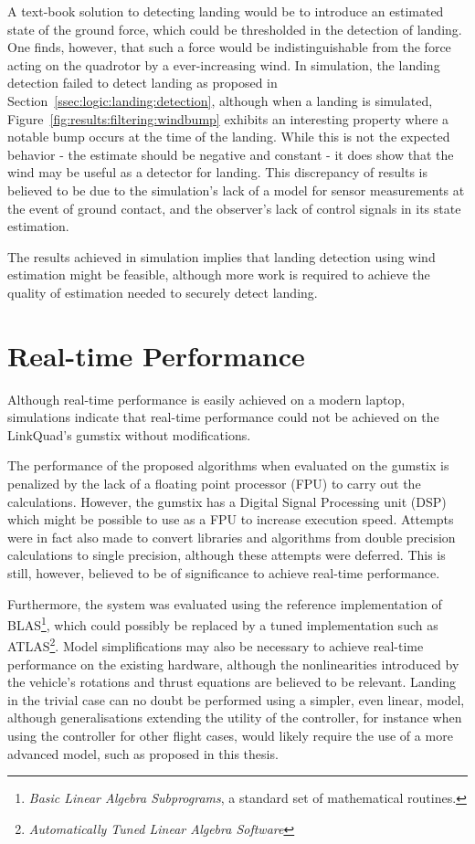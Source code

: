         A text-book solution to detecting landing would be to introduce
        an estimated state of the ground force, which could be thresholded
        in the detection of landing. One finds, however,
        that such a force would be indistinguishable from
        the force acting on the quadrotor by a ever-increasing wind.
        In simulation, the landing detection failed to detect landing
        as proposed in Section~\ref{ssec:logic:landing:detection}, although
        when a landing is simulated, Figure~\ref{fig:results:filtering:windbump}
        exhibits an interesting property where a notable bump occurs at the
        time of the landing. While this is not the expected behavior
        - the estimate should be negative and constant -
        it does show that the wind may be useful as a detector for landing.
        This discrepancy of results is believed to be due to
        the simulation's lack of a model for sensor measurements at the event of ground contact,
        and the observer's lack of control signals in its state estimation.

        The results achieved in simulation implies that landing detection
        using wind estimation might be feasible, although more work is required
        to achieve the quality of estimation needed to securely detect landing.
\pagebreak
    \section{Real-time Performance}
        Although real-time performance is easily achieved on a modern laptop,
        simulations indicate that real-time performance
        could not be achieved on the LinkQuad's gumstix without modifications.

        The performance of the proposed algorithms when evaluated on the
        gumstix is penalized by the lack of a floating point processor (FPU) to
        carry out the calculations. However, the gumstix has a
        Digital Signal Processing unit (DSP) which might be possible to
        use as a FPU to increase execution speed.
        Attempts were in fact also made to convert libraries and algorithms from
        double precision calculations to single precision, although these attempts were deferred.
        This is still, however, believed to be of significance to achieve real-time performance.

        Furthermore, the system was evaluated
        using the reference implementation of BLAS\footnote{\textit{Basic Linear Algebra Subprograms},
        a standard set of mathematical routines.}, which could possibly
        be replaced by a tuned implementation such as ATLAS\footnote{\textit{Automatically Tuned Linear Algebra Software}}.
        Model simplifications may also be necessary to achieve real-time performance
        on the existing hardware, although the nonlinearities introduced 
        by the vehicle's rotations and thrust equations are believed to be relevant.
        Landing in the trivial case can no doubt be performed using a simpler, even linear, model,
        although generalisations extending the utility of the controller, for instance when
        using the controller for other flight cases, would likely require the use
        of a more advanced model, such as proposed in this thesis.
